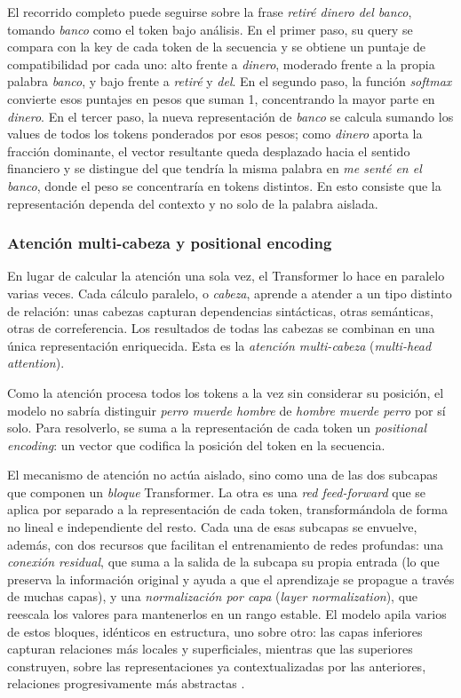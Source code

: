 El recorrido completo puede seguirse sobre la frase \textit{retiré dinero del banco}, tomando \textit{banco} como el token bajo análisis. En el primer paso, su query se compara con la key de cada token de la secuencia y se obtiene un puntaje de compatibilidad por cada uno: alto frente a \textit{dinero}, moderado frente a la propia palabra \textit{banco}, y bajo frente a \textit{retiré} y \textit{del}. En el segundo paso, la función \textit{softmax} convierte esos puntajes en pesos que suman 1, concentrando la mayor parte en \textit{dinero}. En el tercer paso, la nueva representación de \textit{banco} se calcula sumando los values de todos los tokens ponderados por esos pesos; como \textit{dinero} aporta la fracción dominante, el vector resultante queda desplazado hacia el sentido financiero y se distingue del que tendría la misma palabra en \textit{me senté en el banco}, donde el peso se concentraría en tokens distintos. En esto consiste que la representación dependa del contexto y no solo de la palabra aislada.

\subsubsection*{Atención multi-cabeza y positional encoding}

En lugar de calcular la atención una sola vez, el Transformer lo hace en paralelo varias veces. Cada cálculo paralelo, o \textit{cabeza}, aprende a atender a un tipo distinto de relación: unas cabezas capturan dependencias sintácticas, otras semánticas, otras de correferencia. Los resultados de todas las cabezas se combinan en una única representación enriquecida. Esta es la \textit{atención multi-cabeza} (\textit{multi-head attention}).

Como la atención procesa todos los tokens a la vez sin considerar su posición, el modelo no sabría distinguir \textit{perro muerde hombre} de \textit{hombre muerde perro} por sí solo. Para resolverlo, se suma a la representación de cada token un \textit{positional encoding}: un vector que codifica la posición del token en la secuencia.

El mecanismo de atención no actúa aislado, sino como una de las dos subcapas que componen un \textit{bloque} Transformer. La otra es una \textit{red feed-forward} que se aplica por separado a la representación de cada token, transformándola de forma no lineal e independiente del resto. Cada una de esas subcapas se envuelve, además, con dos recursos que facilitan el entrenamiento de redes profundas: una \textit{conexión residual}, que suma a la salida de la subcapa su propia entrada (lo que preserva la información original y ayuda a que el aprendizaje se propague a través de muchas capas), y una \textit{normalización por capa} (\textit{layer normalization}), que reescala los valores para mantenerlos en un rango estable. El modelo apila varios de estos bloques, idénticos en estructura, uno sobre otro: las capas inferiores capturan relaciones más locales y superficiales, mientras que las superiores construyen, sobre las representaciones ya contextualizadas por las anteriores, relaciones progresivamente más abstractas \parencite{vaswani_2017_attention}.

